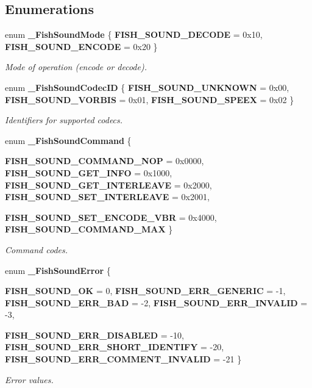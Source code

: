 \subsection*{Enumerations}
\begin{CompactItemize}
\item 
enum {\bf \_\-Fish\-Sound\-Mode} \{ {\bf FISH\_\-SOUND\_\-DECODE} =  0x10, 
{\bf FISH\_\-SOUND\_\-ENCODE} =  0x20
 \}
\begin{CompactList}\small\item\em Mode of operation (encode or decode). \item\end{CompactList}\item 
enum {\bf \_\-Fish\-Sound\-Codec\-ID} \{ {\bf FISH\_\-SOUND\_\-UNKNOWN} =  0x00, 
{\bf FISH\_\-SOUND\_\-VORBIS} =  0x01, 
{\bf FISH\_\-SOUND\_\-SPEEX} =  0x02
 \}
\begin{CompactList}\small\item\em Identifiers for supported codecs. \item\end{CompactList}\item 
enum {\bf \_\-Fish\-Sound\-Command} \{ \par
{\bf FISH\_\-SOUND\_\-COMMAND\_\-NOP} =  0x0000, 
{\bf FISH\_\-SOUND\_\-GET\_\-INFO} =  0x1000, 
{\bf FISH\_\-SOUND\_\-GET\_\-INTERLEAVE} =  0x2000, 
{\bf FISH\_\-SOUND\_\-SET\_\-INTERLEAVE} =  0x2001, 
\par
{\bf FISH\_\-SOUND\_\-SET\_\-ENCODE\_\-VBR} =  0x4000, 
{\bf FISH\_\-SOUND\_\-COMMAND\_\-MAX}
 \}
\begin{CompactList}\small\item\em Command codes. \item\end{CompactList}\item 
enum {\bf \_\-Fish\-Sound\-Error} \{ \par
{\bf FISH\_\-SOUND\_\-OK} =  0, 
{\bf FISH\_\-SOUND\_\-ERR\_\-GENERIC} =  -1, 
{\bf FISH\_\-SOUND\_\-ERR\_\-BAD} =  -2, 
{\bf FISH\_\-SOUND\_\-ERR\_\-INVALID} =  -3, 
\par
{\bf FISH\_\-SOUND\_\-ERR\_\-DISABLED} =  -10, 
{\bf FISH\_\-SOUND\_\-ERR\_\-SHORT\_\-IDENTIFY} =  -20, 
{\bf FISH\_\-SOUND\_\-ERR\_\-COMMENT\_\-INVALID} =  -21
 \}
\begin{CompactList}\small\item\em Error values. \item\end{CompactList}\end{CompactItemize}



